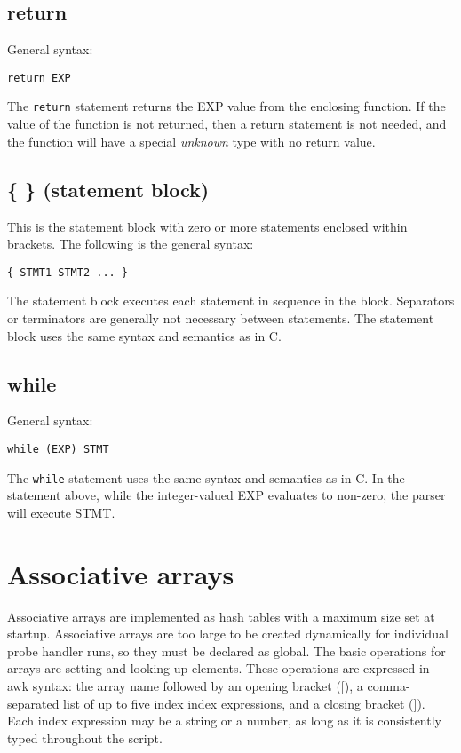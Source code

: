 \documentclass[twoside,english]{article}
\newenvironment{vindent}
{\begin{list}{}{\setlength{\listparindent}{6pt}}
\item[]}
{\end{list}}
\begin{document}
\subsection{return}
General syntax:

\begin{vindent}
\begin{verbatim}
return EXP
\end{verbatim}
\end{vindent}
The \texttt{return} statement returns the EXP value from the enclosing function.
If the value of the function is not returned, then a return statement is
not needed, and the function will have a special \emph{unknown} type with
no return value.

\subsection{\{ \} (statement block)}
\index{\{ \}}
This is the statement block with zero or more statements enclosed within
brackets. The following is the general syntax:

\begin{vindent}
\begin{verbatim}
{ STMT1 STMT2 ... }
\end{verbatim}
\end{vindent}
The statement block executes each statement in sequence in the block. Separators
or terminators are generally not necessary between statements. The statement
block uses the same syntax and semantics as in C.


\subsection{while}
General syntax:

\begin{vindent}
\begin{verbatim}
while (EXP) STMT
\end{verbatim}
\end{vindent}
The \texttt{while} statement uses the same syntax and semantics as in C.
In the statement above, while the integer-valued EXP evaluates to non-zero,
the parser will execute STMT. 


\section{Associative arrays\label{sec:Associative-Arrays}}
Associative arrays are implemented as hash tables with a maximum size set
at startup. Associative arrays are too large to be created dynamically for
individual probe handler runs, so they must be declared as global. The basic
operations for arrays are setting and looking up elements. These operations
are expressed in awk syntax: the array name followed by an opening bracket
({[}), a comma-separated list of up to five index index expressions, and
a closing bracket (]). Each index expression may be a string or a number,
as long as it is consistently typed throughout the script.
\end{document}
